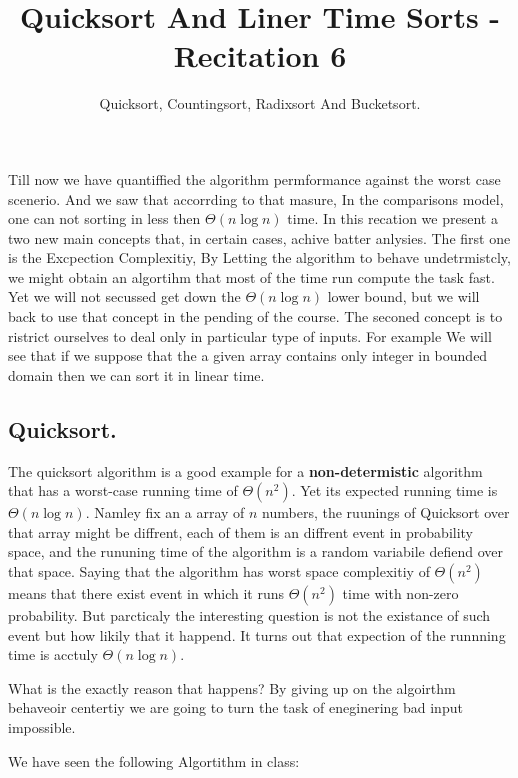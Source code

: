 \title{Quicksort And Liner Time Sorts  - Recitation 6} 
\author{Quicksort, Countingsort, Radixsort And Bucketsort.}


Till now we have quantiffied the algorithm permformance against the worst case scenerio. And we saw that accorrding to that masure, In the comparisons model, one can not sorting in less then $\Theta\left( n\log n \right) $ time.  In this recation we present a two new main concepts that, in certain cases, achive batter anlysies. The first one is the Excpection Complexitiy, By Letting the algorithm to behave undetrmistcly, we might obtain an algortihm that most of the time run compute the task fast. Yet we will not secussed get down the $\Theta\left(n\log n\right)$ lower bound, but we will back to use that concept in the pending of the course. The seconed concept is to ristrict ourselves to deal only in particular type of inputs. For example We will see that if we suppose that the a given array contains only integer in bounded domain then we can sort it in linear time.  


\subsection{Quicksort.}
The quicksort algorithm is a good example for a \textbf{non-determistic} algorithm that has a worst-case running time of $\Theta\left(n^{2}\right)$. Yet its expected running time is $\Theta\left(n\log n\right)$. Namley fix an a array of $n$ numbers, the ruunings of Quicksort over that array might be diffrent, each of them is an diffrent event in probability space, and the rununing time of the algorithm is a random variabile defiend over that space. Saying that the algorithm has worst space complexitiy of $\Theta(n^{2})$ means that there exist event in which it runs $\Theta\left(n^{2}\right)$ time with non-zero probability. But parcticaly the interesting question is not the existance of such event but how likily that it happend. It turns out that  expection of the runnning time is acctuly $\Theta\left(n\log n\right)$.  

What is the exactly reason that happens? By giving up on the algoirthm behaveoir centertiy we are going to turn the task of eneginering bad input impossible.    

We have seen the following Algortithm in class: 


